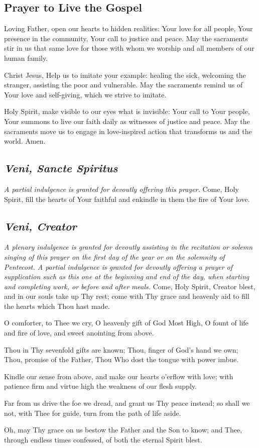 \documentclass[12pt]{article}
\newcommand{\prayertitle}[1]{\subsection{#1}}
\newcommand{\indulgencedprayertitle}[1]{\prayertitle{#1 \protect\kreuz}}
\newcommand{\foreign}[1]{\textsl{#1}}
\newcommand{\note}[1]{{\small{\textsl{#1}}}\newline}
\begin{document}
\prayertitle{Prayer to Live the Gospel}
Loving Father, open our hearts to hidden realities:
Your love for all people,
Your presence in the community,
Your call to justice and peace.
May the sacraments stir in us
that same love for those with whom we worship and all members of our human family.

Christ Jesus, Help us to imitate your example:
healing the sick,
welcoming the stranger,
assisting the poor and vulnerable.
May the sacraments remind us
of Your love and self-giving,
which we strive to imitate.

Holy Spirit, make visible to our eyes what is invisible:
Your call to Your people,
Your summons to live our faith daily
as witnesses of justice and peace.
May the sacraments move us to engage in love-inspired action that transforms us and the world.
Amen.

\indulgencedprayertitle{\foreign{Veni, Sancte Spiritus}}
\note{A partial indulgence is granted for devoutly offering this prayer.}
Come, Holy Spirit, fill the hearts of Your faithful and enkindle in them the fire of Your love.

\indulgencedprayertitle{\foreign{Veni, Creator}}
\note{A plenary indulgence is granted for devoutly assisting in the recitation or solemn singing of this prayer on the first day of the year or on the solemnity of Pentecost.
A partial indulgence is granted for devoutly offering a prayer of supplication such as this one at the beginning and end of the day, when starting and completing work, or before and after meals.}
Come, Holy Spirit, Creator blest,
and in our souls take up Thy rest;
come with Thy grace and heavenly aid
to fill the hearts which Thou hast made.

O comforter, to Thee we cry,
O heavenly gift of God Most High,
O fount of life and fire of love,
and sweet anointing from above.

Thou in Thy sevenfold gifts are known;
Thou, finger of God's hand we own;
Thou, promise of the Father, Thou
Who dost the tongue with power imbue.

Kindle our sense from above,
and make our hearts o'erflow with love;
with patience firm and virtue high
the weakness of our flesh supply.

Far from us drive the foe we dread,
and grant us Thy peace instead;
so shall we not, with Thee for guide,
turn from the path of life aside.

Oh, may Thy grace on us bestow
the Father and the Son to know;
and Thee, through endless times confessed,
of both the eternal Spirit blest.
\end{document}

